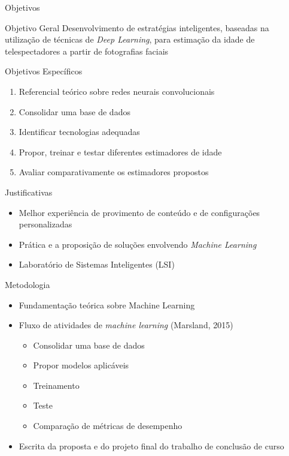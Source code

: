 \begin{frame}{Objetivos}
   \ \  \\[0.1cm]
  \begin{block}{Objetivo Geral}
  Desenvolvimento de estratégias inteligentes, baseadas na utilização de técnicas de \emph{Deep Learning}, para estimação da idade de telespectadores a partir de fotografias faciais
  \end{block}
  \pause
  \begin{block}{Objetivos Específicos}
    \begin{enumerate}
      \item Referencial teórico sobre redes neurais convolucionais
      \item Consolidar uma base de dados
      \item Identificar tecnologias adequadas
      \item Propor, treinar e testar diferentes estimadores de idade
      \item Avaliar comparativamente os estimadores propostos

    \end{enumerate}
  \end{block}


\end{frame}

\begin{frame}{Justificativas}
  \begin{itemize}
  \item Melhor experiência de provimento de conteúdo e de configurações personalizadas
  \ \ \newline
  \item Prática e a proposição de soluções envolvendo \emph{Machine Learning}
  \ \ \newline
  \item Laboratório de Sistemas Inteligentes (LSI)
\end{itemize}
\end{frame}

\begin{frame}{Metodologia}
   \ \  \\[0.1cm]
  \begin{itemize}
  \item Fundamentação teórica sobre Machine Learning\ \ \newline
  \item Fluxo de atividades de \emph{machine learning} (Marsland, 2015)
  \begin{itemize}
    \item Consolidar uma base de dados
    \item Propor modelos aplicáveis
    \item Treinamento
    \item Teste
    \item Comparação de métricas de desempenho\ \ \newline
  \end{itemize}
  \item Escrita da proposta e do projeto final do trabalho de conclusão de curso
\end{itemize}
\end{frame}

